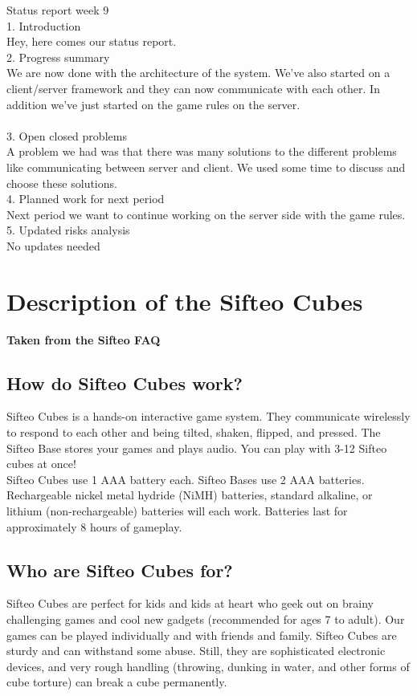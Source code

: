 Status report week 9\\
1. Introduction\\
Hey, here comes our status report.\\

2. Progress summary\\
We are now done with the architecture of the system. We've also started on a client/server framework and they can now communicate with each other. In addition we've just started on the game rules on the server. \\
\\
3. Open closed problems\\ 
A problem we had was that there was many solutions to the different problems like communicating between server and client. We used some time to discuss and choose these solutions. \\

4. Planned work for next period\\ 
Next period we want to continue working on the server side with the game rules.\\

5. Updated risks analysis\\
No updates needed


\chapter{Description of the Sifteo Cubes}
\label{appendix:G}

\textbf{Taken from the Sifteo FAQ}


\section{How do Sifteo Cubes work?}
Sifteo Cubes is a hands-on interactive game system. They communicate wirelessly to respond to each other and being tilted, shaken, flipped, and pressed. The Sifteo Base stores your games and plays audio. You can play with 3-12 Sifteo cubes at once!\\
Sifteo Cubes use 1 AAA battery each. Sifteo Bases use 2 AAA batteries. Rechargeable nickel metal hydride (NiMH) batteries, standard alkaline, or lithium (non-rechargeable) batteries will each work. Batteries last for approximately 8 hours of gameplay.

\section{Who are Sifteo Cubes for?}
Sifteo Cubes are perfect for kids and kids at heart who geek out on brainy challenging games and cool new gadgets (recommended for ages 7 to adult). Our games can be played individually and with friends and family. Sifteo Cubes are sturdy and can withstand some abuse. Still, they are sophisticated electronic devices, and very rough handling (throwing, dunking in water, and other forms of cube torture) can break a cube permanently.

